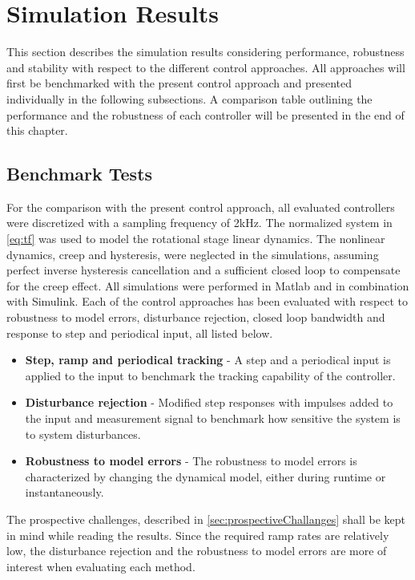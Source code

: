 \chapter{Simulation Results}\label{cha:result}
This section describes the simulation results considering performance, robustness and stability with respect to the different control approaches. All approaches will first be benchmarked with the present control approach and presented individually in the following subsections. A comparison table outlining the performance and the robustness of each controller will be presented in the end of this chapter.

\section{Benchmark Tests}
For the comparison with the present control approach, all evaluated controllers were discretized with a sampling frequency of 2kHz. The normalized system in \eqref{eq:tf} was used to model the rotational stage linear dynamics. The nonlinear dynamics, creep and hysteresis, were neglected in the simulations, assuming perfect inverse hysteresis cancellation and a sufficient closed loop to compensate for the creep effect. All simulations were performed in Matlab and in combination with Simulink. Each of the control approaches has been evaluated with respect to robustness to model errors, disturbance rejection, closed loop bandwidth and response to step and periodical input, all listed below.

\begin{itemize}
\item {\bf Step, ramp and periodical tracking} - A step and a periodical input is applied to the input to benchmark the tracking capability of the controller.
\item {\bf Disturbance rejection} - Modified step responses with impulses added to the input and measurement signal to benchmark how sensitive the system is to system disturbances.
\item {\bf Robustness to model errors} - The robustness to model errors is characterized by changing the dynamical model, either during runtime or instantaneously.
\end{itemize}

 The prospective challenges, described in \ref{sec:prospectiveChallanges} shall be kept in mind while reading the results. Since the required ramp rates are relatively low, the disturbance rejection and the robustness to model errors are more of interest when evaluating each method.

